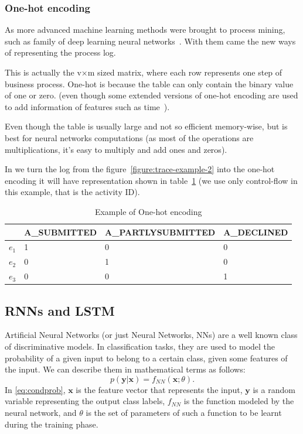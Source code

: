 \subsubsection{One-hot encoding} \label{one-hot-encoding}

As more advanced machine learning methods were brought to process mining, such as family of deep learning neural networks~\cite{evermann,niek96732,quteprints96732,evermann2}. With them came the new ways of representing the process log.

This is actually the v×m sized matrix, where each row represents one step of business process. One-hot is because the table can only contain the binary value of one or zero. (even though some extended versions of one-hot encoding are used to add information of features such as time~\cite{niek96732}). 

Even though the table is usually large and not so efficient memory-wise, but is best for neural networks computations (as most of the operations are multiplications, it's easy to multiply and add ones and zeros). 

In we turn the log from the figure~\ref{figure:trace-example-2} into the one-hot encoding it will have representation shown in table~\ref{tab:one-hot} (we use only control-flow in this example, that is the activity ID).

\begin{table}[h]
	\centering
	\begin{tabular}{| l | l | l | l |}
		\hline
		& A\_SUBMITTED & A\_PARTLYSUBMITTED & A\_DECLINED \\	
		\hline
		$e_{1}$ & 1 & 0 & 0 \\
		$e_{2}$ & 0 & 1 & 0 \\
		$e_{3}$ & 0 & 0 & 1 \\
		\hline
	\end{tabular}
	\caption{Example of One-hot encoding}
	\label{tab:one-hot}
\end{table}



\subsection{RNNs and LSTM}
Artificial Neural Networks (or just Neural Networks, NNs) are a well
known class of discriminative models. In classification tasks, they are
used to model the probability of a given input to belong to a certain
class, given some features of the input. We can describe them in
mathematical terms as follows:
%
\begin{equation}
  \label{eq:condprob}
  p(\mathbf{y}|\mathbf{x}) = f_{\mathit{NN}}(\mathbf{x}; \theta).
\end{equation}
%
In \eqref{eq:condprob}, $\mathbf{x}$ is the feature vector that represents the input,
$\mathbf{y}$ is a random variable representing the output class
labels, $f_{\mathit{NN}}$ is the function modeled by the neural network, and
$\theta$ is the set of parameters of such a function to be learnt during
the training phase.


